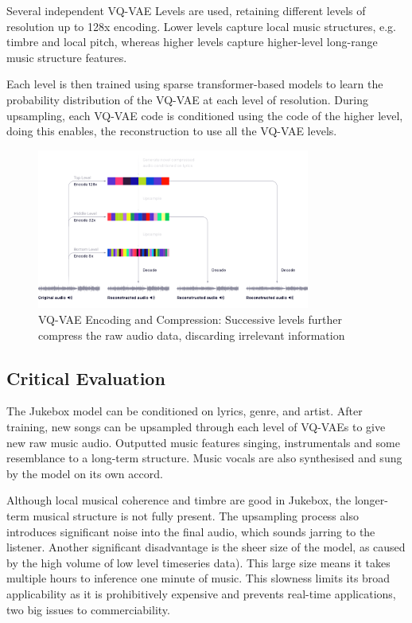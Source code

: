 Several independent VQ-VAE Levels are used, retaining different levels of resolution up to 128x encoding. Lower levels capture local music structures, e.g. timbre and local pitch, whereas higher levels capture higher-level long-range music structure features.

Each level is then trained using sparse transformer-based models to learn the probability distribution of the VQ-VAE at each level of resolution. During upsampling, each VQ-VAE code is conditioned using the code of the higher level, doing this enables, the reconstruction to use all the VQ-VAE levels.

\begin{figure}[H]
    \centering
    \includegraphics[width=0.8\textwidth]{literature_review/vq-vae.png}
    \caption{VQ-VAE Encoding and Compression: Successive levels further compress the raw audio data, discarding irrelevant information\cite{Jukebox}}
    \label{fig:jukebox_example}
\end{figure}

\subsection{Critical Evaluation}

The Jukebox model can be conditioned on lyrics, genre, and artist. After training, new songs can be upsampled through each level of VQ-VAEs to give new raw music audio. Outputted music features singing, instrumentals and some resemblance to a long-term structure. Music vocals are also synthesised and sung by the model on its own accord.

Although local musical coherence and timbre are good in Jukebox, the longer-term musical structure is not fully present. The upsampling process also introduces significant noise into the final audio, which sounds jarring to the listener. Another significant disadvantage is the sheer size of the model, as caused by the high volume of low level timeseries data). This large size means it takes multiple hours to inference one minute of music. This slowness limits its broad applicability as it is prohibitively expensive and prevents real-time applications, two big issues to commerciability.

